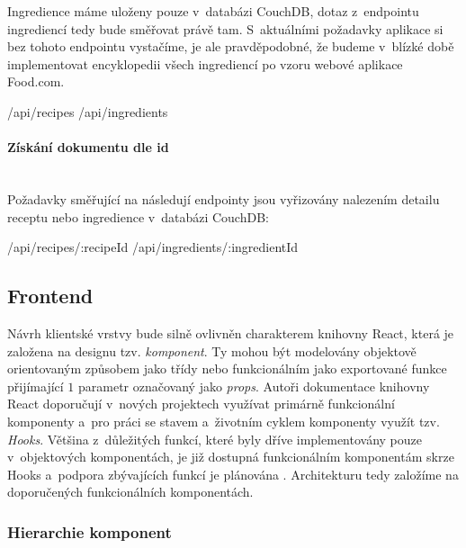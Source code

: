 Ingredience máme uloženy pouze v~databázi CouchDB, dotaz z~endpointu ingrediencí tedy bude směřovat právě tam. S~aktuálními požadavky aplikace si bez tohoto endpointu vystačíme, je ale pravděpodobné, že budeme v~blízké době implementovat encyklopedii všech ingrediencí po vzoru webové aplikace Food.com.

\begin{code}
/api/recipes
/api/ingredients
\end{code}

\paragraph{Získání dokumentu dle id}\mbox{}\\

Požadavky směřující na následují endpointy jsou vyřizovány nalezením detailu receptu nebo ingredience v~databázi CouchDB:

\begin{code}
/api/recipes/:recipeId
/api/ingredients/:ingredientId
\end{code}

\subsection{Frontend}

Návrh klientské vrstvy bude silně ovlivněn charakterem knihovny React, která je založena na designu tzv. \emph{komponent}. Ty mohou být modelovány objektově orientovaným způsobem jako třídy nebo funkcionálním jako exportované funkce přijímající $1$ parametr označovaný jako \emph{props}. Autoři dokumentace knihovny React doporučují v~nových projektech využívat primárně funkcionální komponenty a~pro práci se stavem a~životním cyklem komponenty využít tzv. \emph{Hooks}. Většina z~důležitých funkcí, které byly dříve implementovány pouze v~objektových komponentách, je již dostupná funkcionálním komponentám skrze Hooks a~podpora zbývajících funkcí je plánována \citep{class-or-functional}. Architekturu tedy založíme na doporučených funkcionálních komponentách.

\subsubsection{Hierarchie komponent}

